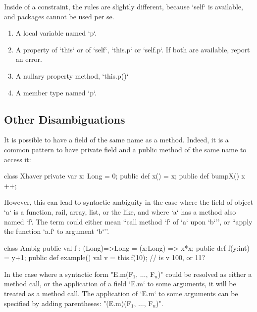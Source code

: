 Inside of a constraint, the rules are slightly different, because \xcd`self`
is available, and packages cannot be used per se.
\begin{enumerate}
\item A local variable named \xcd`p`.
\item A property of \xcd`this` or of \xcd`self`, \viz{} \xcd`this.p` or
      \xcd`self.p`.  If both are available, report an error.
\item A nullary property method, \xcd`this.p()`
\item A member type named \xcd`p`.
\end{enumerate}

\subsection{Other Disambiguations}
\label{sect:disambiguations}

It is possible to have a field of the same name as a method.
Indeed, it is a common pattern to have private field and a public
method of the same name to access it:
\begin{ex}
\begin{xten}
class Xhaver {
  private var x: Long = 0;
  public def x() = x;
  public def bumpX() { x ++; }
}
\end{xten}
%
\end{ex}

\begin{ex}
However, this can lead to syntactic ambiguity in the case where the field
 of object \xcd`a` is a
function, rail, array, list, or the like, and where \xcd`a` 
has a method also named
\xcd`f`.  The term  could either mean ``call method \xcd`f` of \xcd`a` upon
\xcd`b`'', or ``apply the function \xcd`a.f` to argument \xcd`b`''.  

\begin{xten}
class Ambig {
  public val f : (Long)=>Long =  (x:Long) => x*x;
  public def f(y:int) = y+1;
  public def example() {
      val v = this.f(10);
      // is v 100, or 11?
  }
}
\end{xten}
%
\end{ex}

In the case where a syntactic form \xcdmath"E.m(F$_1$, $\ldots$, F$_n$)" could
be resolved as either a method call, or the application of a field \xcd`E.m`
to some arguments, it will be treated as a method call.  
The application of \xcd`E.m` to some arguments can be specified by adding
parentheses:  \xcdmath"(E.m)(F$_1$, $\ldots$, F$_n$)".

